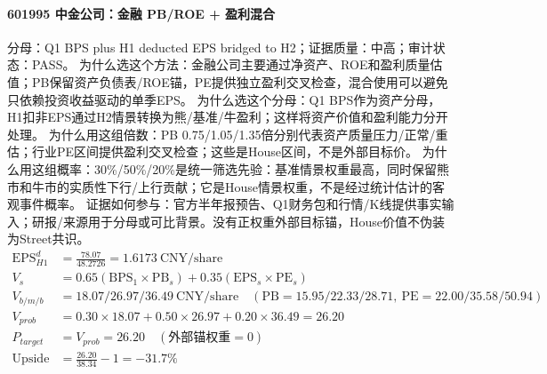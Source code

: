 \paragraph{601995 中金公司：金融 PB/ROE + 盈利混合}
分母：Q1 BPS plus H1 deducted EPS bridged to H2；证据质量：中高；审计状态：PASS。
为什么选这个方法：金融公司主要通过净资产、ROE和盈利质量估值；PB保留资产负债表/ROE锚，PE提供独立盈利交叉检查，混合使用可以避免只依赖投资收益驱动的单季EPS。
为什么选这个分母：Q1 BPS作为资产分母，H1扣非EPS通过H2情景转换为熊/基准/牛盈利；这样将资产价值和盈利能力分开处理。
为什么用这组倍数：PB 0.75/1.05/1.35倍分别代表资产质量压力/正常/重估；行业PE区间提供盈利交叉检查；这些是House区间，不是外部目标价。
为什么用这组概率：30\%/50\%/20\%是统一筛选先验：基准情景权重最高，同时保留熊市和牛市的实质性下行/上行贡献；它是House情景权重，不是经过统计估计的客观事件概率。
证据如何参与：官方半年报预告、Q1财务包和行情/K线提供事实输入；研报/来源用于分母或可比背景。没有正权重外部目标锚，House价值不伪装为Street共识。
\begin{align*}
\mathrm{EPS}_{H1}^d &= \frac{78.07}{48.2726} = 1.6173\ \mathrm{CNY/share}\\
V_s &= 0.65\left(\mathrm{BPS}_1\times \mathrm{PB}_s\right)+0.35\left(\mathrm{EPS}_s\times \mathrm{PE}_s\right)\\
V_{b/m/b} &= 18.07/26.97/36.49\ \mathrm{CNY/share}\quad(\mathrm{PB}=15.95/22.33/28.71,\ \mathrm{PE}=22.00/35.58/50.94)\\
V_{prob} &= 0.30\times 18.07+0.50\times 26.97+0.20\times 36.49=26.20\\
P_{target} &= V_{prob}=26.20\quad(\text{外部锚权重}=0)\\
\mathrm{Upside} &= \frac{26.20}{38.34}-1=-31.7\%\\
\end{align*}


